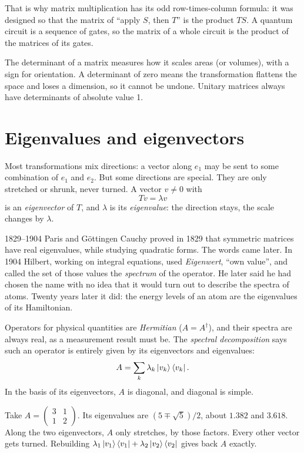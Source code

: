 That is why matrix multiplication has its odd row-times-column formula: it was
designed so that the matrix of ``apply $S$, then $T$'' is the product $TS$. A
quantum circuit is a sequence of gates, so the matrix of a whole circuit is the
product of the matrices of its gates.

The determinant of a matrix measures how it scales areas (or volumes), with a
sign for orientation. A determinant of zero means the transformation flattens the
space and loses a dimension, so it cannot be undone. Unitary matrices always have
determinants of absolute value 1.

\section{Eigenvalues and eigenvectors}

Most transformations mix directions: a vector along $e_1$ may be sent to some
combination of $e_1$ and $e_2$. But some directions are special. They are only
stretched or shrunk, never turned. A vector $v \neq 0$ with
\[
  T v = \lambda v
\]
is an \emph{eigenvector} of $T$, and $\lambda$ is its \emph{eigenvalue}: the
direction stays, the scale changes by $\lambda$.

\begin{history}{1829--1904 \textperiodcentered{} Paris and Göttingen}
Cauchy proved in 1829 that symmetric matrices have real eigenvalues, while
studying quadratic forms. The words came later. In 1904 Hilbert, working on
integral equations, used \emph{Eigenwert}, ``own value'', and called the set of
those values the \emph{spectrum} of the operator. He later said he had chosen
the name with no idea that it would turn out to describe the spectra of atoms.
Twenty years later it did: the energy levels of an atom are the eigenvalues of its
Hamiltonian.
\end{history}

Operators for physical quantities are \emph{Hermitian} ($A = A^\dagger$), and
their spectra are always real, as a measurement result must be. The
\emph{spectral decomposition} says such an operator is entirely given by its
eigenvectors and eigenvalues:
\[
  A = \sum_k \lambda_k \ket{v_k}\bra{v_k} .
\]
In the basis of its eigenvectors, $A$ is diagonal, and diagonal is simple.

Take $A = \begin{pmatrix} 3 & 1 \\ 1 & 2 \end{pmatrix}$. Its eigenvalues are
$(5 \mp \sqrt5)/2$, about $1.382$ and $3.618$. Along the two eigenvectors, $A$
only stretches, by those factors. Every other vector gets turned. Rebuilding
$\lambda_1\ket{v_1}\bra{v_1} + \lambda_2\ket{v_2}\bra{v_2}$ gives back $A$ exactly.

